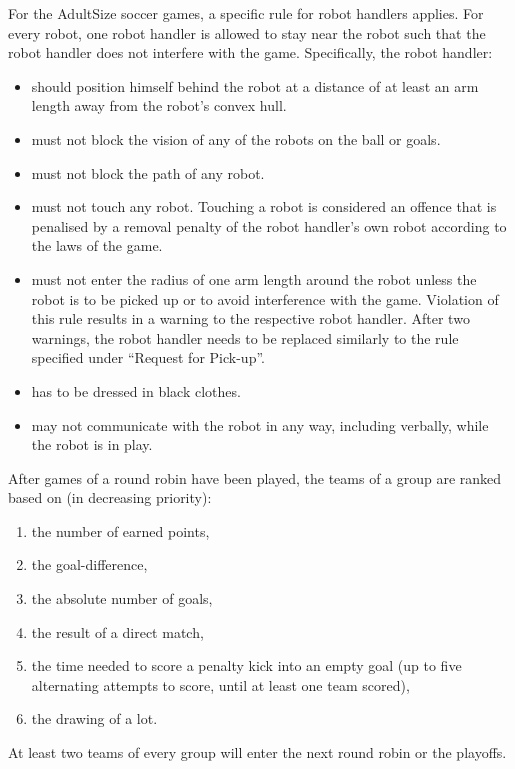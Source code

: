 \bigskip

For the AdultSize soccer games, a specific rule for robot handlers applies. For every robot, one robot handler is allowed to stay near the robot such that the robot handler does not interfere with the game. Specifically, the robot handler:
\begin{itemize}
\item should position himself behind the robot at a distance of at least an arm length away from the robot's convex hull.
\item must not block the vision of any of the robots on the ball or goals.
\item must not block the path of any robot.
\item must not touch any robot. Touching a robot is considered an offence that is penalised by a removal penalty of the robot handler's own robot according to the laws of the game.
\item must not enter the radius of one arm length around the robot unless the robot is to be picked up or to avoid interference with the game. Violation of this rule results in a warning to the respective robot handler. After two warnings, the robot handler needs to be replaced similarly to the rule specified under ``Request for Pick-up''.
\item has to be dressed in black clothes.
\item may not communicate with the robot in any way, including verbally, while the robot is in play.
\end{itemize}
\color{black}

\bigskip

After games of a round robin have been played, the teams of a group are ranked based on (in decreasing priority): 

\begin{enumerate}
\item the number of earned points,
\item the goal-difference,
\item the absolute number of goals,
\item the result of a direct match,
\item the time needed to score a penalty kick into an empty goal (up to five alternating attempts to score, until at least one team scored),
\item the drawing of a lot.
\end{enumerate}

\bigskip


At least two teams of every group will enter the next round robin or the playoffs.

